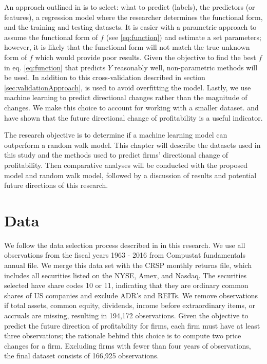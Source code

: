 An approach outlined in \cite{Monahan} is to select: what to predict (labels), the predictors (or features), a regression model where the researcher determines the functional form,  and the training and testing datasets.  It is easier with a parametric approach to assume the functional form of \(f\) (see \ref{eq:function}) and estimate a set parameters; however,  it is likely that the functional form will not match the true unknown form of \(f\) which would provide poor results.  Given the objective to find the best \(f\) in eq. \ref{eq:function} that predicts \(Y\) reasonably well,  non-parametric methods will be used.  In addition to this cross-validation described in section \ref{sec:validationApproach}, is used to avoid overfitting the model.  Lastly, we use machine learning to predict directional changes rather than the magnitude of changes. We make this choice to account for working with a smaller dataset.  \cite{BB68} and \cite{OU1989295} have shown that the future directional change of profitability is a useful indicator. 

The research objective is to determine if a machine learning model can outperform a random walk model.  This chapter will describe the datasets used in this study and the methods used to predict firms' directional change of profitability.  Then comparative analyses will be conducted with the proposed model and random walk model, followed by a discussion of results and potential future directions of this research.

\section{Data} \label{sec:ABIS:Data}

We follow the data selection process described in \cite{HOU2012504} in this research. We use all observations from the fiscal years 1963 - 2016 from Compustat fundamentals annual file. We merge this data set with the CRSP monthly returns file, which includes all securities listed on the NYSE,  Amex,  and Nasdaq. The securities selected have share codes 10 or 11, indicating that they are ordinary common shares of US companies and exclude ADR's and REITs. We remove observations if total assets, common equity, dividends, income before extraordinary items,  or accruals are missing, resulting in 194,172 observations.  Given the objective to predict the future direction of profitability for firms, each firm must have at least three observations; the rationale behind this choice is to compute two price changes for a firm. Excluding firms with fewer than four years of observations, the final dataset consists of 166,925 observations. 

